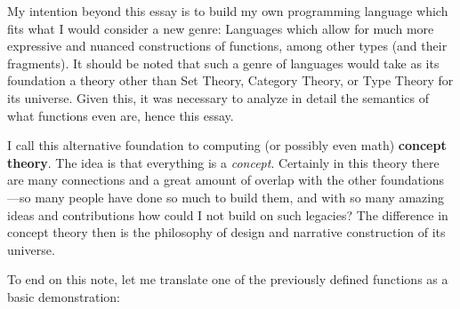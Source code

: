 \documentclass[twoside]{article}
\newcommand{\strong}[1]{{\bfseries #1}}
\begin{document}
My intention beyond this essay is to build my own programming language which fits what I would consider a
new genre: Languages which allow for much more expressive and nuanced constructions of functions, among other
types (and their fragments). It should be noted that such a genre of languages would take as its foundation
a theory other than Set Theory, Category Theory, or Type Theory for its universe. Given this, it was necessary
to analyze in detail the semantics of what functions even are, hence this essay.

I call this alternative foundation to computing (or possibly even math) \strong{concept theory}. The idea is that
everything is a \emph{concept}. Certainly in this theory there are many connections and a great amount of overlap
with the other foundations---so many people have done so much to build them, and with so many amazing ideas
and contributions how could I not build on such legacies? The difference in concept theory then is
the philosophy of design and narrative construction of its universe.

To end on this note, let me translate one of the previously defined functions as a basic demonstration:

\newpage
\end{document}
